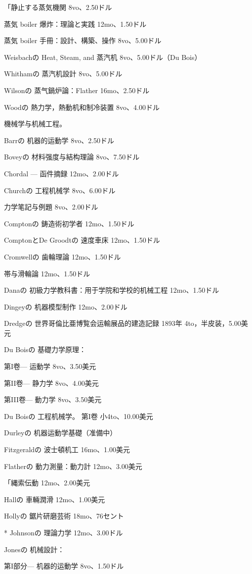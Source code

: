 \documentclass[a4paper,11pt,openany]{ltjsbook}
\begin{document}
「静止する蒸気機関 8vo、2.50ドル

蒸気 boiler 爆炸：理論と実践 12mo、1.50ドル

蒸気 boiler 手冊：設計、構築、操作 8vo、5.00ドル

Weisbachの Heat, Steam, and 蒸汽机 8vo、5.00ドル（Du Bois）

Whithamの 蒸汽机設計 8vo、5.00ドル

Wilsonの 蒸气鍋炉論：Flather 16mo、2.50ドル

Woodの 熱力学，熱動机和制冷装置 8vo、4.00ドル

機械学与机械工程。

Barrの 机器的运動学 8vo、2.50ドル

Boveyの 材料强度与結构理論 8vo、7.50ドル

Chordal — 函件摘録 12mo、2.00ドル

Churchの 工程机械学 8vo、6.00ドル

力学笔記与例題 8vo、2.00ドル

Comptonの 鋳造術初学者 12mo、1.50ドル

ComptonとDe Groodtの 速度車床 12mo、1.50ドル

Cromwellの 歯輪理論 12mo、1.50ドル

帯与滑輪論 12mo、1.50ドル

Danaの 初級力学教科書：用于学院和学校的机械工程 12mo、1.50ドル

Dingeyの 机器模型制作 12mo、2.00ドル

Dredgeの 世界哥倫比亜博覧会运輸展品的建造記録 1893年 4to，半皮装，5.00美元

Du Boisの 基礎力学原理：

第I卷— 运動学 8vo、3.50美元

第II卷— 静力学 8vo、4.00美元

第III卷— 動力学 8vo、3.50美元

Du Boisの 工程机械学。 第I卷 小4to、10.00美元

Durleyの 机器运動学基礎（准備中）

Fitzgeraldの 波士頓机工 16mo、1.00美元

Flatherの 動力測量：動力計 12mo、3.00美元

「縄索伝動 12mo、2.00美元

Hallの 車輛潤滑 12mo、1.00美元

Hollyの 鋸片研磨芸術 18mo、76セント

* Johnsonの 理論力学 12mo、3.00ドル

Jonesの 机械設計：

第I部分— 机器的运動学 8vo、1.50ドル
\end{document}
